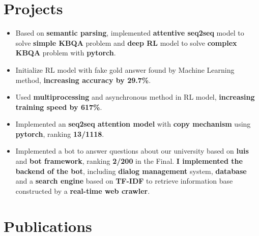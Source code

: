 \documentclass[11pt,a4paper]{moderncv}
\begin{document}
\section{Projects}
{
\begin{itemize}
\item Based on \textbf{semantic parsing}, implemented \textbf{attentive seq2seq} model to solve \textbf{simple KBQA} problem and \textbf{deep RL} model to solve \textbf{complex KBQA} problem with \textbf{pytorch}.
\item Initialize RL model with fake gold answer found by Machine Learning method, \textbf{increasing accuracy by 29.7\%}. 
\item Used \textbf{multiprocessing} and asynchronous method in RL model, \textbf{increasing training speed by 617\%}.
\end{itemize}}

{
\begin{itemize}
\item Implemented an \textbf{seq2seq attention model} with \textbf{copy mechanism} using \textbf{pytorch}, ranking \textbf{13/1118}.
\item Implemented a bot to answer questions about our university based on \textbf{luis} and \textbf{bot framework}, ranking \textbf{2/200} in the Final. \textbf{I implemented the backend of the bot}, including \textbf{dialog management} system, \textbf{database} and a \textbf{search engine} based on \textbf{TF-IDF} to retrieve information base constructed by a \textbf{real-time web crawler}.
\end{itemize}}

\section{Publications}
\end{document}
